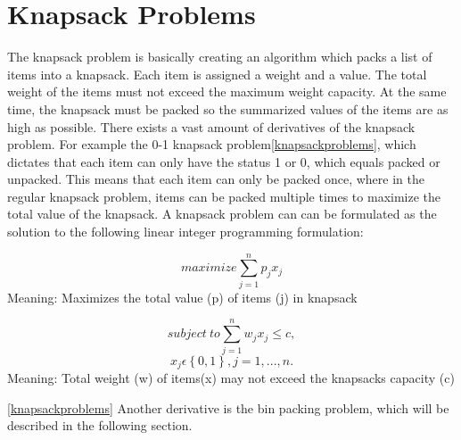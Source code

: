 \section{Knapsack Problems}
\label{sec:knapsack}
The knapsack problem is basically creating an algorithm which packs a list of items into a knapsack. Each item is assigned a weight and a value. The total weight of the items must not exceed the maximum weight capacity. At the same time, the knapsack must be packed so the summarized values of the items are as high as possible. There exists a vast amount of derivatives of the knapsack problem. For example the 0-1 knapsack problem\ref{knapsackproblems}, which dictates that each item can only have the status 1 or 0, which equals packed or unpacked. This means that each item can only be packed once, where in the regular knapsack problem, items can be packed multiple times to maximize the total value of the knapsack. A knapsack problem can can be formulated as the solution to the following linear integer programming formulation:


\[maximize \sum\limits_{j=1}^n p_jx_j\]
Meaning: Maximizes the total value (p) of items (j) in knapsack

\[subject~to \sum\limits_{j=1}^n w_jx_j\leq c,\]
\[x_j \epsilon \left \{ 0,1 \right \}, j=1,...,n.\]
Meaning: Total weight (w) of items(x) may not exceed the knapsacks capacity (c)

 \ref{knapsackproblems}
\newline
Another derivative is the bin packing problem, which will be described in the following section.